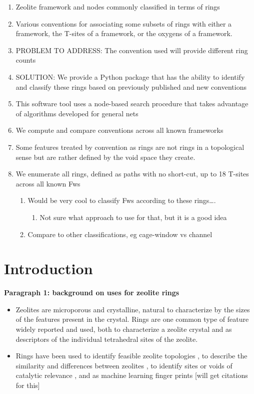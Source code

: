 \documentclass[11pt]{article}
\begin{document}
\begin{enumerate}
\item Zeolite framework and nodes commonly classified in terms of rings
\item Various conventions for associating some subsets of rings with either a framework, the T-sites of a framework, or the oxygens of a framework.
\item PROBLEM TO ADDRESS: The convention used will provide different ring counts
\item SOLUTION: We provide a Python package that has the ability to identify and classify these rings based on previously published and new conventions
\item This software tool uses a node-based search procedure that takes advantage of algorithms developed for general nets
\item We compute and compare conventions across all known frameworks
\item Some features treated by convention as rings are not rings in a topological sense but are rather defined by the void space they create.
\item We enumerate all rings, defined as paths with no short-cut, up to 18 T-sites across all known Fws
\begin{enumerate}
\item Would be very cool to classify Fws according to these rings\ldots{}.
\begin{enumerate}
\item Not sure what approach to use for that, but it is a good idea
\end{enumerate}
\item Compare to other classifications, eg cage-window vs channel
\end{enumerate}
\end{enumerate}

\section{Introduction}
\label{sec:org5fd2860}

\textbf{\textbf{Paragraph 1: background on uses for zeolite rings}}
\begin{itemize}
\item Zeolites are microporous and crystalline, natural to characterize by the sizes of the features present in the crystal.  Rings are one common type of feature widely reported and used, both to characterize a zeolite crystal and as descriptors of the individual tetrahedral sites of the zeolite.

\item Rings have been used to identify feasible zeolite topologies \cite{li-why-2014}, to describe the similarity and differences between zeolites \cite{curtis-statistical-2003}, to identify sites or voids of catalytic relevance \cite{li-first-principles-2018,kester-effects-2021}, and as machine learning finger prints [will get citations for this]
\end{itemize}
\end{document}
